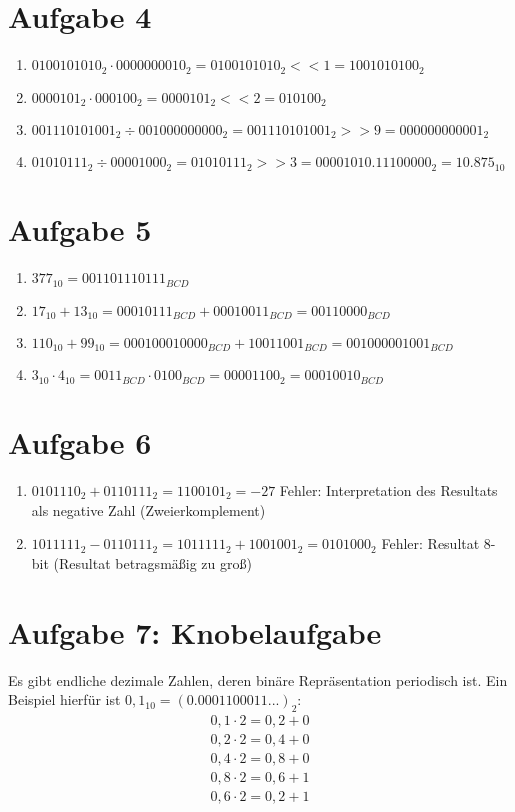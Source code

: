 \documentclass[a4paper]{article}
\begin{document}
\section*{Aufgabe 4}
\begin{enumerate}[label=\alph*)]
    \item $0100101010_2 \cdot 0000000010_2 = 0100101010_2 << 1 = 1001010100_2$
    \item $0000101_2 \cdot 000100_2 = 0000101_2 << 2 = 010100_2$
    \item $001110101001_2 \div 001000000000_2 = 001110101001_2 >> 9 =000000000001_2 $
    \item $01010111_2 \div 00001000_2 = 01010111_2 >> 3 = 00001010.11100000_2 = 10.875_{10}$
\end{enumerate}

\section*{Aufgabe 5}
\begin{enumerate}[label=\alph*)]
    \item $377_{10} = 001101110111_{BCD}$
    \item $17_{10} + 13_{10} = 00010111_{BCD} + 00010011_{BCD} = 00110000_{BCD}$
    \item $110_{10} + 99_{10} = 000100010000_{BCD} + 10011001_{BCD} = 001000001001_{BCD}$
    \item $3_{10} \cdot 4_{10} = 0011_{BCD} \cdot 0100_{BCD} = 00001100_2 = 00010010_{BCD}$
\end{enumerate}

\section*{Aufgabe 6}
\begin{enumerate}[label=\alph*)]
    \item $0101110_2 + 0110111_2 = 1100101_2 = -27$ Fehler: Interpretation des Resultats als negative Zahl (Zweierkomplement)
    \item $1011111_2 - 0110111_2 = 1011111_2 + 1001001_2 = 0101000_2$ Fehler: Resultat 8-bit (Resultat betragsmäßig zu groß)
\end{enumerate}

\section*{Aufgabe 7: Knobelaufgabe}
Es gibt endliche dezimale Zahlen, deren binäre Repräsentation periodisch ist. Ein Beispiel hierfür ist $0,1_{10} = (0.0001100011...)_2:$
\begin{align*}
	0,1 \cdot 2 = 0,2 + 0 \\
	0,2 \cdot 2 = 0,4 + 0 \\
	0,4 \cdot 2 = 0,8 + 0 \\
	0,8 \cdot 2 = 0,6 + 1 \\
	0,6 \cdot 2 = 0,2 + 1
\end{align*}
\end{document}
